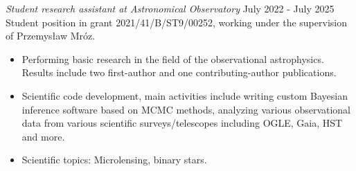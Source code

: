 \documentclass[margin, 10pt]{res} %
\begin{document}
\begin{resume}
{\sl Student research assistant at Astronomical Observatory} \hfil July 2022 - July 2025\\
Student position in grant 2021/41/B/ST9/00252, working under the supervision of Przemysław Mróz.
\begin{itemize}
    \item Performing basic research in the field of the observational astrophysics. Results include two first-author and one contributing-author publications.
    \item Scientific code development, main activities include writing custom Bayesian inference software based on MCMC methods, analyzing various observational data
    from various scientific surveys/telescopes including OGLE, Gaia, HST and more.
    \item Scientific topics: Microlensing, binary stars.
\end{itemize}

\end{resume}
\end{document}
